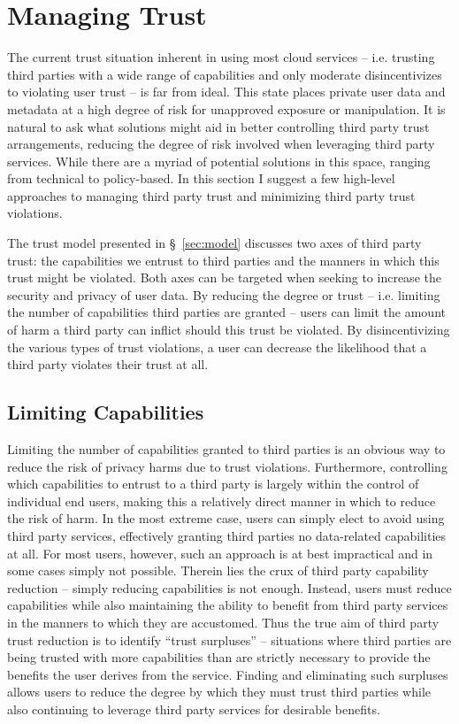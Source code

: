 \section{Managing Trust}
\label{sec:mitigation}

The current trust situation inherent in using most cloud services --
i.e. trusting third parties with a wide range of capabilities and only
moderate disincentivizes to violating user trust -- is far from
ideal. This state places private user data and metadata at a high
degree of risk for unapproved exposure or manipulation. It is natural
to ask what solutions might aid in better controlling third party
trust arrangements, reducing the degree of risk involved when
leveraging third party services. While there are a myriad of potential
solutions in this space, ranging from technical to policy-based. In
this section I suggest a few high-level approaches to managing third
party trust and minimizing third party trust violations.

The trust model presented in \S~\ref{sec:model} discusses two axes of
third party trust: the capabilities we entrust to third parties and
the manners in which this trust might be violated. Both axes can be
targeted when seeking to increase the security and privacy of user
data. By reducing the degree or trust -- i.e. limiting the number of
capabilities third parties are granted -- users can limit the amount
of harm a third party can inflict should this trust be violated. By
disincentivizing the various types of trust violations, a user can
decrease the likelihood that a third party violates their trust at
all.

\subsection{Limiting Capabilities}
\label{sec:mitigation:capabilities}

Limiting the number of capabilities granted to third parties is an
obvious way to reduce the risk of privacy harms due to trust
violations. Furthermore, controlling which capabilities to entrust to
a third party is largely within the control of individual end users,
making this a relatively direct manner in which to reduce the risk of
harm. In the most extreme case, users can simply elect to avoid using
third party services, effectively granting third parties no
data-related capabilities at all. For most users, however, such an
approach is at best impractical and in some cases simply not
possible. Therein lies the crux of third party capability reduction --
simply reducing capabilities is not enough. Instead, users must reduce
capabilities while also maintaining the ability to benefit from third
party services in the manners to which they are accustomed. Thus the
true aim of third party trust reduction is to identify ``trust
surpluses'' -- situations where third parties are being trusted with
more capabilities than are strictly necessary to provide the benefits
the user derives from the service. Finding and eliminating such
surpluses allows users to reduce the degree by which they must trust
third parties while also continuing to leverage third party services
for desirable benefits.

